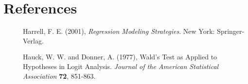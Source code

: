 \documentclass[12pt]{article}
\begin{document}
\section{References}


\begin{description}

\item [] Harrell, F. E. (2001), {\em Regression Modeling Strategies}. New York: Springer-Verlag.

\item [] Hauck, W. W. and Donner, A.  (1977), Wald's Test as Applied to Hypotheses in Logit Analysis. {\em Journal of the American Statistical Association}
{\bf 72}, 851-863.

\end{description}
\end{document}
